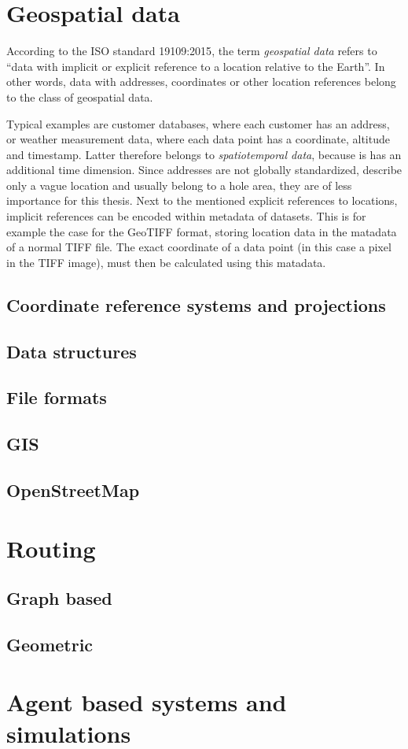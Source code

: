 
\section{Geospatial data}

	According to the ISO standard 19109:2015\cite{geolexica-202}, the term \textit{geospatial data} refers to "`data with implicit or explicit reference to a location relative to the Earth"'.
	In other words, data with addresses, coordinates or other location references belong to the class of geospatial data.
	
	Typical examples are customer databases, where each customer has an address, or weather measurement data, where each data point has a coordinate, altitude and timestamp.
	Latter therefore belongs to \textit{spatiotemporal data}, because is has an additional time dimension.
	Since addresses are not globally standardized, describe only a vague location and usually belong to a hole area, they are of less importance for this thesis.
	Next to the mentioned explicit references to locations, implicit references can be encoded within metadata of datasets.
	This is for example the case for the GeoTIFF format, storing location data in the matadata of a normal TIFF file\cite{ogc-geotiff}.
	The exact coordinate of a data point (in this case a pixel in the TIFF image), must then be calculated using this matadata.

	\subsection{Coordinate reference systems and projections}

	\subsection{Data structures}
	
	\subsection{File formats}
	
	\subsection{GIS}
	
	\subsection{OpenStreetMap}

\section{Routing}

	
	\subsection{Graph based}
	
	\subsection{Geometric}

\section{Agent based systems and simulations}